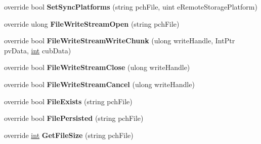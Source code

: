 \begin{DoxyCompactItemize}
\item 
\hypertarget{classValve_1_1Steamworks_1_1CSteamRemoteStorage_a97affa6ebfad8b2bc6d52d0df578c53f}{}override bool {\bfseries Set\+Sync\+Platforms} (string pch\+File, uint e\+Remote\+Storage\+Platform)\label{classValve_1_1Steamworks_1_1CSteamRemoteStorage_a97affa6ebfad8b2bc6d52d0df578c53f}

\item 
\hypertarget{classValve_1_1Steamworks_1_1CSteamRemoteStorage_a75b00758156d55a01875e8805d243637}{}override ulong {\bfseries File\+Write\+Stream\+Open} (string pch\+File)\label{classValve_1_1Steamworks_1_1CSteamRemoteStorage_a75b00758156d55a01875e8805d243637}

\item 
\hypertarget{classValve_1_1Steamworks_1_1CSteamRemoteStorage_a7bc19f07ae3ecf38494c440f915a7695}{}override bool {\bfseries File\+Write\+Stream\+Write\+Chunk} (ulong write\+Handle, Int\+Ptr pv\+Data, \hyperlink{SDL__thread_8h_a6a64f9be4433e4de6e2f2f548cf3c08e}{int} cub\+Data)\label{classValve_1_1Steamworks_1_1CSteamRemoteStorage_a7bc19f07ae3ecf38494c440f915a7695}

\item 
\hypertarget{classValve_1_1Steamworks_1_1CSteamRemoteStorage_abb6b8686b0784d7652d5af4a8605b2ea}{}override bool {\bfseries File\+Write\+Stream\+Close} (ulong write\+Handle)\label{classValve_1_1Steamworks_1_1CSteamRemoteStorage_abb6b8686b0784d7652d5af4a8605b2ea}

\item 
\hypertarget{classValve_1_1Steamworks_1_1CSteamRemoteStorage_a11d7bc487c8ef3ee3a8a6e4dfc669090}{}override bool {\bfseries File\+Write\+Stream\+Cancel} (ulong write\+Handle)\label{classValve_1_1Steamworks_1_1CSteamRemoteStorage_a11d7bc487c8ef3ee3a8a6e4dfc669090}

\item 
\hypertarget{classValve_1_1Steamworks_1_1CSteamRemoteStorage_a3971d800d14f6e1b3d1222a8e7941cd3}{}override bool {\bfseries File\+Exists} (string pch\+File)\label{classValve_1_1Steamworks_1_1CSteamRemoteStorage_a3971d800d14f6e1b3d1222a8e7941cd3}

\item 
\hypertarget{classValve_1_1Steamworks_1_1CSteamRemoteStorage_a1ebec4001709294d6b3c33a2533f66f3}{}override bool {\bfseries File\+Persisted} (string pch\+File)\label{classValve_1_1Steamworks_1_1CSteamRemoteStorage_a1ebec4001709294d6b3c33a2533f66f3}

\item 
\hypertarget{classValve_1_1Steamworks_1_1CSteamRemoteStorage_ace1d06c686b8108eeb6370d8fba825e9}{}override \hyperlink{SDL__thread_8h_a6a64f9be4433e4de6e2f2f548cf3c08e}{int} {\bfseries Get\+File\+Size} (string pch\+File)\label{classValve_1_1Steamworks_1_1CSteamRemoteStorage_ace1d06c686b8108eeb6370d8fba825e9}


\end{DoxyCompactItemize}
